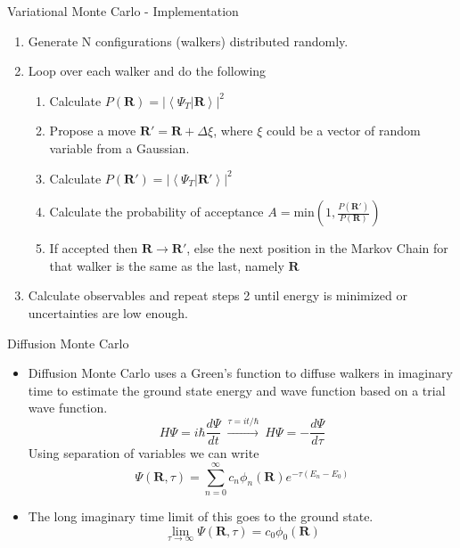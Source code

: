 \documentclass{beamer}
\newcommand{\braket}[2]{\left< #1 | #2 \right>}
\newcommand{\R}{\mathbf{R}}
\begin{document}
\begin{frame}{Variational Monte Carlo - Implementation}
\begin{enumerate}
   \item Generate N configurations (walkers) distributed randomly.
   \item Loop over each walker and do the following
   \begin{enumerate}
      \setlength\itemsep{0.2em}
      \item Calculate $P(\R) = \left|\braket{\Psi_T}{\R}\right|^2$
      \item Propose a move $\R' = \R + \Delta\xi$, where $\xi$ could be a vector of random variable from a Gaussian.
      \item Calculate $P(\R') = \left|\braket{\Psi_T}{\R'}\right|^2$
      \item Calculate the probability of acceptance $A=\mathrm{min}\left(1,\frac{P(\R')}{P(\R)}\right)$
      \item If accepted then $\R \rightarrow \R'$, else the next position in the Markov Chain for that walker is the same as the last, namely $\R$
   \end{enumerate}
   \item Calculate observables and repeat steps 2 until energy is minimized or uncertainties are low enough.
\end{enumerate}
\end{frame}

\begin{frame}{Diffusion Monte Carlo}
\begin{itemize}
   \item Diffusion Monte Carlo uses a Green's function to diffuse walkers in imaginary time to estimate the ground state energy and wave function based on a trial wave function.
   \begin{equation*}
      H\Psi = i\hbar\frac{d\Psi}{dt} ~ \xrightarrow{\tau=it/\hbar} ~ H\Psi = -\frac{d\Psi}{d\tau}
   \end{equation*}
   Using separation of variables we can write
   \begin{equation*}
      \Psi(\R,\tau) = \sum\limits_{n=0}^{\infty} c_n\phi_n(\R) e^{-\tau(E_n-E_0)}
   \end{equation*}
   \item The long imaginary time limit of this goes to the ground state.
   \begin{equation*}
      \lim\limits_{\tau\rightarrow\infty} \Psi(\R,\tau) = c_0\phi_0(\R)
   \end{equation*}
\end{itemize}
\end{frame}
\end{document}
